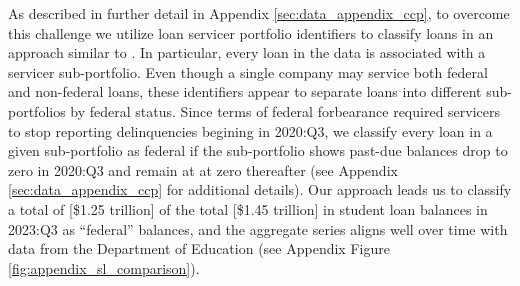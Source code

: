\documentclass[12pt]{article}
\begin{document}
As described in further detail in Appendix \ref{sec:data_appendix_ccp}, to overcome this challenge we utilize loan servicer portfolio identifiers to classify loans in an approach similar to \cite{GossMangrumScaley2024}.  In particular, every loan in the data is associated with a servicer sub-portfolio. Even though a single company may service both federal and non-federal loans, these identifiers appear to separate loans into different sub-portfolios by federal status. Since terms of federal forbearance required servicers to stop reporting delinquencies begining in 2020:Q3, we classify every loan in a given sub-portfolio as federal if the sub-portfolio shows past-due balances drop to zero in 2020:Q3 and remain at at zero thereafter (see Appendix \ref{sec:data_appendix_ccp} for additional details). Our approach leads us to classify a total of [\$1.25 trillion] of the total [\$1.45 trillion] in student loan balances in 2023:Q3 as ``federal'' balances, and the aggregate series aligns well over time with data from the Department of Education (see Appendix Figure \cref{fig:appendix_sl_comparison}).
\end{document}
